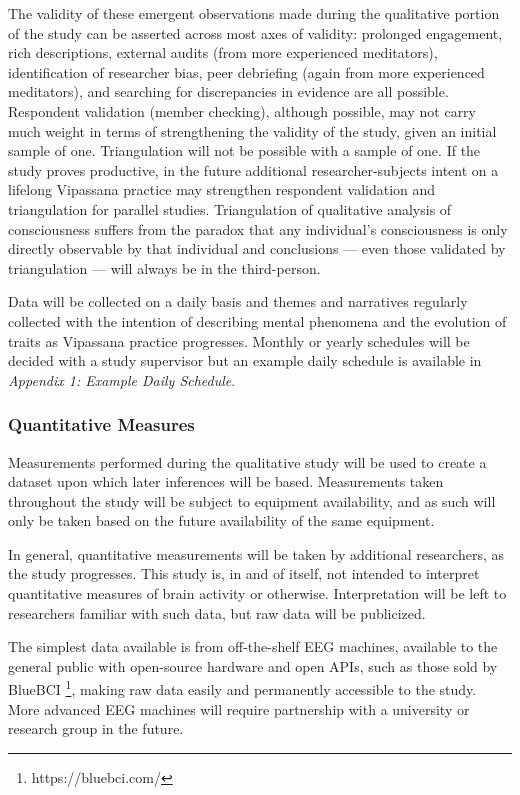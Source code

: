 \documentclass[a4paper, amsfonts, amssymb, amsmath, reprint, showkeys, nofootinbib, twoside]{revtex4-1}
\begin{document}
The validity of these emergent observations made during the qualitative portion of
the study can be asserted across most axes of validity: prolonged engagement, rich
descriptions, external audits (from more experienced meditators), identification of
researcher bias, peer debriefing (again from more experienced meditators), and
searching for discrepancies in evidence are all possible. Respondent validation (member
checking), although possible, may not carry much weight in terms of strengthening the
validity of the study, given an initial sample of one. Triangulation will not be
possible with a sample of one. If the study proves productive, in the future
additional researcher-subjects intent on a lifelong Vipassana practice may strengthen
respondent validation and triangulation for parallel studies. Triangulation of
qualitative analysis of consciousness suffers from the paradox that any individual's
consciousness is only directly observable by that individual and conclusions --- even
those validated by triangulation --- will always be in the third-person.

Data will be collected on a daily basis and themes and narratives regularly collected
with the intention of
describing mental phenomena and the evolution of traits as Vipassana practice
progresses. Monthly or yearly schedules will be decided with a
study supervisor but an example daily schedule is available in
\textit{Appendix 1: Example Daily Schedule}.

\subsubsection{Quantitative Measures}

Measurements performed during the qualitative study will be used to create a
dataset upon which later inferences will be based.
Measurements taken throughout the study will be subject to equipment availability,
and as such will only be taken based on the future availability of the same
equipment.

In general, quantitative measurements will be taken by additional researchers,
as the study progresses.
This study is, in and of itself, not intended to interpret quantitative measures
of brain activity or otherwise.
Interpretation will be left to researchers familiar with such data, but raw
data will be publicized.

The simplest data available is from off-the-shelf EEG machines, available to
the general public with open-source hardware and open APIs, such as those
sold by BlueBCI \footnote{https://bluebci.com/}, making raw data
easily and permanently accessible to the study.
More advanced EEG machines will require partnership with a university or
research group in the future.
\end{document}
